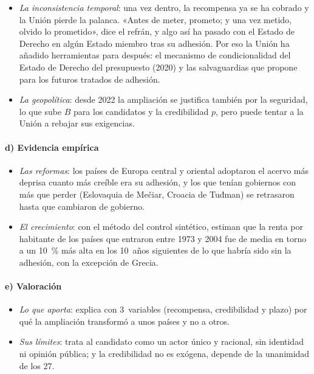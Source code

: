 \documentclass[11pt]{article}
\begin{document}
\begin{itemize}
\item \emph{La inconsistencia temporal}: una vez dentro, la recompensa ya se ha cobrado y la Unión pierde la palanca. «Antes de meter, prometo; y una vez metido, olvido lo prometido», dice el refrán, y algo así ha pasado con el Estado de Derecho en algún Estado miembro tras su adhesión. Por eso la Unión ha añadido herramientas para después: el mecanismo de condicionalidad del Estado de Derecho del presupuesto (2020) y las salvaguardias que propone para los futuros tratados de adhesión.
\item \emph{La geopolítica}: desde 2022 la ampliación se justifica también por la seguridad, lo que sube $B$ para los candidatos y la credibilidad $p$, pero puede tentar a la Unión a rebajar sus exigencias.
\end{itemize}

\paragraph{d) Evidencia empírica}

\begin{itemize}
\item \emph{Las reformas}: los países de Europa central y oriental adoptaron el acervo más deprisa cuanto más creíble era su adhesión, y los que tenían gobiernos con más que perder (Eslovaquia de Mečiar, Croacia de Tuđman) se retrasaron hasta que cambiaron de gobierno\nocite{Vachudova2005}.
\item \emph{El crecimiento}: con el método del control sintético, \textcite{CamposCoricelliMoretti2019} estiman que la renta por habitante de los países que entraron entre 1973 y 2004 fue de media en torno a un 10~\% más alta en los 10~años siguientes de lo que habría sido sin la adhesión, con la excepción de Grecia.
\end{itemize}

\paragraph{e) Valoración}

\begin{itemize}
\item \emph{Lo que aporta}: explica con 3~variables (recompensa, credibilidad y plazo) por qué la ampliación transformó a unos países y no a otros.
\item \emph{Sus límites}: trata al candidato como un actor único y racional, sin identidad ni opinión pública; y la credibilidad no es exógena, depende de la unanimidad de los 27.
\end{itemize}
\end{document}
